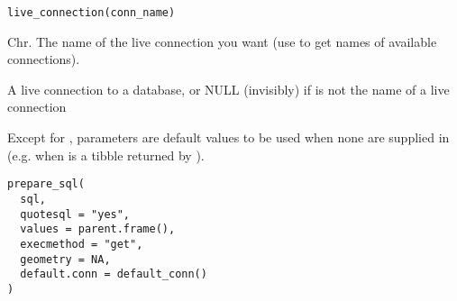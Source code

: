 \documentclass[a4paper]{book}
\begin{document}
%
\begin{Usage}
\begin{verbatim}
live_connection(conn_name)
\end{verbatim}
\end{Usage}
%
\begin{Arguments}
\begin{ldescription}
\item[\code{conn\_name}] Chr. The name of the live connection you want (use
 to get names of available connections).
\end{ldescription}
\end{Arguments}
%
\begin{Value}
A live connection to a database, or NULL (invisibly) if
 is not the name of a live connection
\end{Value}
%
\begin{Description}\relax
Except for , parameters are default values to be used when none are
supplied in  (e.g. when  is a tibble returned by ).
\end{Description}
%
\begin{Usage}
\begin{verbatim}
prepare_sql(
  sql,
  quotesql = "yes",
  values = parent.frame(),
  execmethod = "get",
  geometry = NA,
  default.conn = default_conn()
)
\end{verbatim}
\end{Usage}
%
\end{document}
